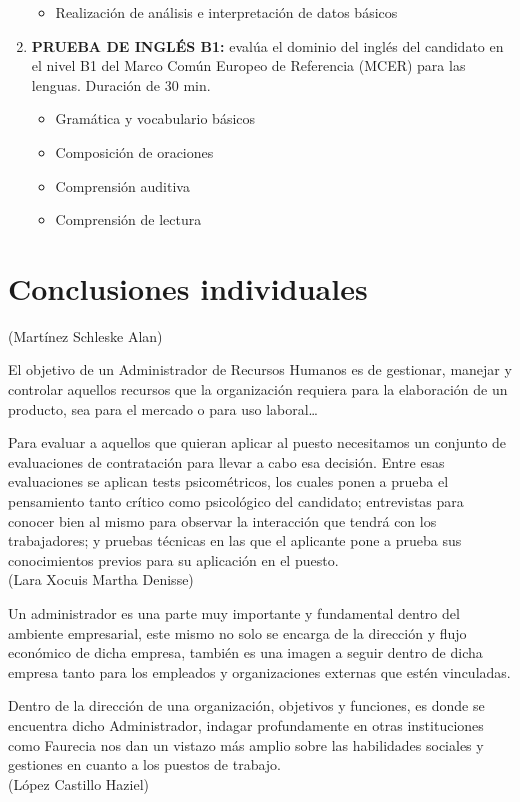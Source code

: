 \documentclass[letterpaper,12pt]{article}
\begin{document}
\begin{sloppypar}
\begin{enumerate}
\begin{itemize}
        \item Realización de análisis e interpretación de datos básicos
    \end{itemize}
    \item \textbf{PRUEBA DE INGLÉS B1:} evalúa el dominio del inglés del candidato en el nivel B1 del Marco Común Europeo de Referencia (MCER) para las lenguas. Duración de 30 min.
    \begin{itemize}
        \item Gramática y vocabulario básicos
        \item Composición de oraciones
        \item Comprensión auditiva
        \item Comprensión de lectura
    \end{itemize}
\end{enumerate}

\section{\textcolor[rgb]{0.4,0.4,0.9}{Conclusiones individuales}}

\noindent (Martínez Schleske Alan)

El objetivo de un Administrador de Recursos Humanos es de gestionar, manejar y controlar aquellos recursos que la organización requiera para la elaboración de un producto, sea para el mercado o para uso laboral\dots

Para evaluar a aquellos que quieran aplicar al puesto necesitamos un conjunto de evaluaciones de contratación para llevar a cabo esa decisión. Entre esas evaluaciones se aplican tests psicométricos, los cuales ponen a prueba el pensamiento tanto crítico como psicológico del candidato; entrevistas para conocer bien al mismo para observar la interacción que tendrá con los trabajadores; y pruebas técnicas en las que el aplicante pone a prueba sus conocimientos previos para su aplicación en el puesto. 
\vspace{0.3cm}\\
(Lara Xocuis Martha Denisse)

Un administrador es una parte muy importante y fundamental dentro del ambiente empresarial, este mismo no solo se encarga de la dirección y flujo económico de dicha empresa, también es una imagen a seguir dentro de dicha empresa tanto para los empleados y organizaciones externas que estén vinculadas.

Dentro de la dirección de una organización, objetivos y funciones, es donde se encuentra dicho Administrador, indagar profundamente en otras instituciones como Faurecia nos dan un vistazo más amplio sobre las habilidades sociales y gestiones en cuanto a los puestos de trabajo. 
\vspace{0.3cm}\\ 
(López Castillo Haziel)


\end{sloppypar}
\end{document}
